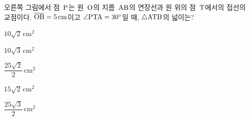 \noindent\begin{minipage}[t]{0.58\linewidth}\vspace{0pt}\raggedright 오른쪽 그림에서 점~$\mathrm{P}$는 원~$\mathrm{O}$의 지름~$\mathrm{AB}$의 연장선과 원 위의 점~$\mathrm{T}$에서의 접선의 교점이다. $\overline{\mathrm{OB}}=5\,\mathrm{cm}$이고 $\angle\mathrm{PTA}=30^\circ$일 때, $\triangle\mathrm{ATB}$의 넓이는?\end{minipage}\hfill\begin{minipage}[t]{0.4\linewidth}\vspace{0pt}\centering \resizebox{\ifdim\width>\linewidth\linewidth\else\width\fi}{!}{}\end{minipage}\par
\begin{choices32}{\rule[-3ex]{0pt}{8ex}$10\sqrt{2}\,\mathrm{cm}^2$}{\rule[-3ex]{0pt}{8ex}$10\sqrt{3}\,\mathrm{cm}^2$}{\rule[-3ex]{0pt}{8ex}$\dfrac{25\sqrt{2}}{2}\,\mathrm{cm}^2$}{\rule[-3ex]{0pt}{8ex}$15\sqrt{2}\,\mathrm{cm}^2$}{\rule[-3ex]{0pt}{8ex}$\dfrac{25\sqrt{3}}{2}\,\mathrm{cm}^2$}\end{choices32}
